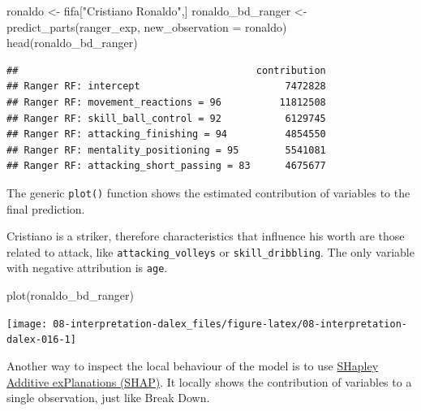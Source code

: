 \documentclass[
]{scrbook}
\newenvironment{Shaded}{\begin{snugshade}}{\end{snugshade}}
\newcommand{\AttributeTok}[1]{\textcolor[rgb]{0.77,0.63,0.00}{#1}}
\newcommand{\FunctionTok}[1]{\textcolor[rgb]{0.00,0.00,0.00}{#1}}
\newcommand{\NormalTok}[1]{#1}
\newcommand{\OtherTok}[1]{\textcolor[rgb]{0.56,0.35,0.01}{#1}}
\newcommand{\StringTok}[1]{\textcolor[rgb]{0.31,0.60,0.02}{#1}}
\renewenvironment{Shaded} {\begin{snugshade}\small} {\end{snugshade}}
\begin{document}
\begin{Shaded}
\begin{Highlighting}[]
\NormalTok{ronaldo }\OtherTok{\textless{}{-}}\NormalTok{ fifa[}\StringTok{"Cristiano Ronaldo"}\NormalTok{,]}
\NormalTok{ronaldo\_bd\_ranger }\OtherTok{\textless{}{-}} \FunctionTok{predict\_parts}\NormalTok{(ranger\_exp,}
                        \AttributeTok{new\_observation =}\NormalTok{ ronaldo)}
\FunctionTok{head}\NormalTok{(ronaldo\_bd\_ranger)}
\end{Highlighting}
\end{Shaded}

\begin{verbatim}
##                                         contribution
## Ranger RF: intercept                         7472828
## Ranger RF: movement_reactions = 96          11812508
## Ranger RF: skill_ball_control = 92           6129745
## Ranger RF: attacking_finishing = 94          4854550
## Ranger RF: mentality_positioning = 95        5541081
## Ranger RF: attacking_short_passing = 83      4675677
\end{verbatim}

The generic \texttt{plot()} function shows the estimated contribution of variables to the final prediction.

Cristiano is a striker, therefore characteristics that influence his worth are those related to attack, like \texttt{attacking\_volleys} or \texttt{skill\_dribbling}. The only variable with negative attribution is \texttt{age}.

\begin{Shaded}
\begin{Highlighting}[]
\FunctionTok{plot}\NormalTok{(ronaldo\_bd\_ranger)}
\end{Highlighting}
\end{Shaded}

\begin{center}\texttt{[image: 08-interpretation-dalex\_files/figure-latex/08-interpretation-dalex-016-1]} \end{center}

Another way to inspect the local behaviour of the model is to use \href{https://pbiecek.github.io/ema/shapley.html}{SHapley Additive exPlanations (SHAP)}. It locally shows the contribution of variables to a single observation, just like Break Down.
\end{document}
